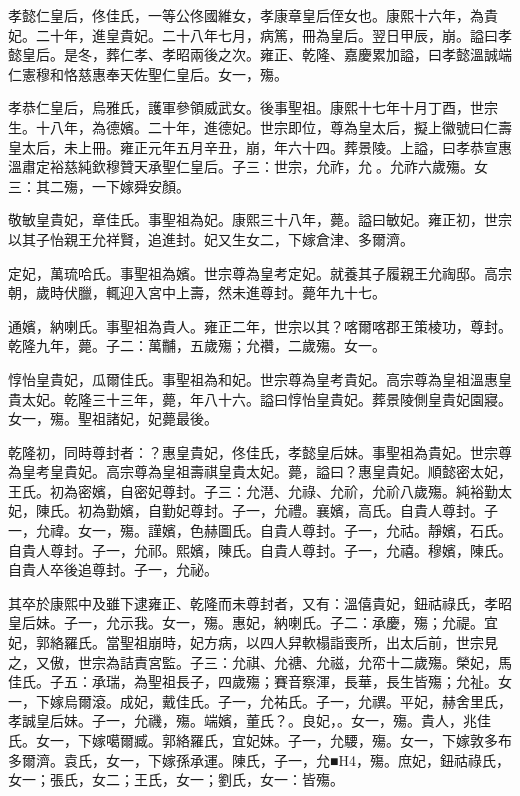 \begin{pinyinscope}
孝懿仁皇后，佟佳氏，一等公佟國維女，孝康章皇后侄女也。康熙十六年，為貴妃。二十年，進皇貴妃。二十八年七月，病篤，冊為皇后。翌日甲辰，崩。謚曰孝懿皇后。是冬，葬仁孝、孝昭兩後之次。雍正、乾隆、嘉慶累加謚，曰孝懿溫誠端仁憲穆和恪慈惠奉天佐聖仁皇后。女一，殤。

孝恭仁皇后，烏雅氏，護軍參領威武女。後事聖祖。康熙十七年十月丁酉，世宗生。十八年，為德嬪。二十年，進德妃。世宗即位，尊為皇太后，擬上徽號曰仁壽皇太后，未上冊。雍正元年五月辛丑，崩，年六十四。葬景陵。上謚，曰孝恭宣惠溫肅定裕慈純欽穆贊天承聖仁皇后。子三：世宗，允祚，允。允祚六歲殤。女三：其二殤，一下嫁舜安顏。

敬敏皇貴妃，章佳氏。事聖祖為妃。康熙三十八年，薨。謚曰敏妃。雍正初，世宗以其子怡親王允祥賢，追進封。妃又生女二，下嫁倉津、多爾濟。

定妃，萬琉哈氏。事聖祖為嬪。世宗尊為皇考定妃。就養其子履親王允祹邸。高宗朝，歲時伏臘，輒迎入宮中上壽，然未進尊封。薨年九十七。

通嬪，納喇氏。事聖祖為貴人。雍正二年，世宗以其？喀爾喀郡王策棱功，尊封。乾隆九年，薨。子二：萬黼，五歲殤；允禶，二歲殤。女一。

惇怡皇貴妃，瓜爾佳氏。事聖祖為和妃。世宗尊為皇考貴妃。高宗尊為皇祖溫惠皇貴太妃。乾隆三十三年，薨，年八十六。謚曰惇怡皇貴妃。葬景陵側皇貴妃園寢。女一，殤。聖祖諸妃，妃薨最後。

乾隆初，同時尊封者：？惠皇貴妃，佟佳氏，孝懿皇后妹。事聖祖為貴妃。世宗尊為皇考皇貴妃。高宗尊為皇祖壽祺皇貴太妃。薨，謚曰？惠皇貴妃。順懿密太妃，王氏。初為密嬪，自密妃尊封。子三：允潖、允祿、允祄，允祄八歲殤。純裕勤太妃，陳氏。初為勤嬪，自勤妃尊封。子一，允禮。襄嬪，高氏。自貴人尊封。子一，允禕。女一，殤。謹嬪，色赫圖氏。自貴人尊封。子一，允祜。靜嬪，石氏。自貴人尊封。子一，允祁。熙嬪，陳氏。自貴人尊封。子一，允禧。穆嬪，陳氏。自貴人卒後追尊封。子一，允祕。

其卒於康熙中及雖下逮雍正、乾隆而未尊封者，又有：溫僖貴妃，鈕祜祿氏，孝昭皇后妹。子一，允示我。女一，殤。惠妃，納喇氏。子二：承慶，殤；允禔。宜妃，郭絡羅氏。當聖祖崩時，妃方病，以四人舁軟榻詣喪所，出太后前，世宗見之，又傲，世宗為詰責宮監。子三：允祺、允禟、允禌，允帟十二歲殤。榮妃，馬佳氏。子五：承瑞，為聖祖長子，四歲殤；賽音察渾，長華，長生皆殤；允祉。女一，下嫁烏爾滾。成妃，戴佳氏。子一，允祐氏。子一，允禩。平妃，赫舍里氏，孝誠皇后妹。子一，允禨，殤。端嬪，董氏？。良妃，。女一，殤。貴人，兆佳氏。女一，下嫁噶爾臧。郭絡羅氏，宜妃妹。子一，允騕，殤。女一，下嫁敦多布多爾濟。袁氏，女一，下嫁孫承運。陳氏，子一，允■H4，殤。庶妃，鈕祜祿氏，女一；張氏，女二；王氏，女一；劉氏，女一：皆殤。


\end{pinyinscope}
